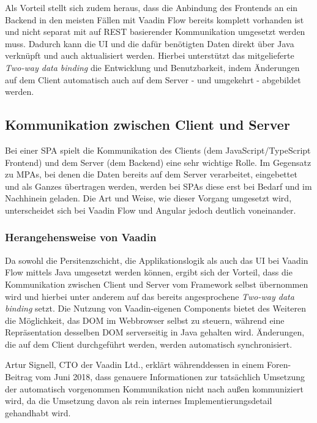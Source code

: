 \documentclass[a4paper,12pt,twoside]{scrreprt}
\begin{document}
Als Vorteil stellt sich zudem heraus, dass die Anbindung des Frontends an ein Backend in den meisten Fällen mit Vaadin Flow bereits komplett vorhanden ist und nicht separat mit auf REST basierender Kommunikation umgesetzt werden muss. Dadurch kann die \acs{UI} und die dafür benötigten Daten direkt über Java verknüpft und auch aktualisiert werden. Hierbei unterstützt das mitgelieferte \textit{Two-way data binding} die Entwicklung und Benutzbarkeit, indem Änderungen auf dem Client automatisch auch auf dem Server - und umgekehrt - abgebildet werden. \parencite[][Framework - Introduction - Overview]{vaadin_ltd_documentation_nodate}

\subsection{Kommunikation zwischen Client und Server}
\label{sub-sec:kommunikation-client-server}
Bei einer \ac{SPA} spielt die Kommunikation des Clients (dem JavaScript/TypeScript Frontend) und dem Server (dem Backend) eine sehr wichtige Rolle. Im Gegensatz zu \acp{MPA}, bei denen die Daten bereits auf dem Server verarbeitet, eingebettet und als Ganzes übertragen werden, werden bei \acsp{SPA} diese erst bei Bedarf und im Nachhinein geladen. Die Art und Weise, wie dieser Vorgang umgesetzt wird, unterscheidet sich bei Vaadin Flow und Angular jedoch deutlich voneinander.

\subsubsection{Herangehensweise von Vaadin}
\label{sub-sub-sec:kommunikation-herangehensweise-vaadin}
Da sowohl die Persitenzschicht, die Applikationslogik als auch das \acl{UI} bei Vaadin Flow mittels Java umgesetzt werden können, ergibt sich der Vorteil, dass die Kommunikation zwischen Client und Server vom Framework selbst übernommen wird und hierbei unter anderem auf das bereits angesprochene \textit{Two-way data binding} setzt. Die Nutzung von Vaadin-eigenen Components bietet des Weiteren die Möglichkeit, das \ac{DOM} im Webbrowser selbst zu steuern, während eine Repräsentation desselben \ac{DOM} serverseitig in Java gehalten wird. Änderungen, die auf dem Client durchgeführt werden, werden automatisch synchronisiert. \parencite[][Framework - Introduction - Core Concepts]{vaadin_ltd_documentation_nodate}

\medskip

Artur Signell, CTO der Vaadin Ltd., erklärt währenddessen in einem Foren-Beitrag vom Juni 2018, dass genauere Informationen zur tatsächlich Umsetzung der automatisch vorgenommen Kommunikation nicht nach außen kommuniziert wird, da die Umsetzung davon als rein internes Implementierungsdetail gehandhabt wird. \parencite[][]{signell_explanation_2018}
\end{document}
